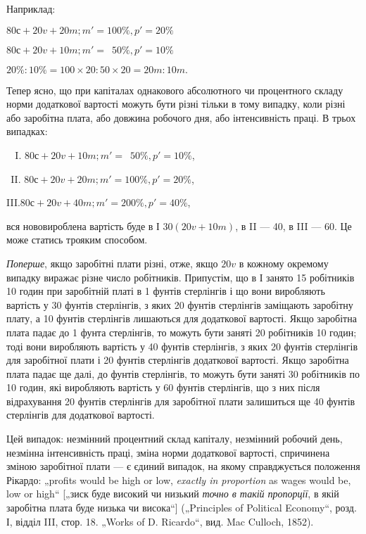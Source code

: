 
Наприклад:
\begin{center}
$80 с + 20 v + 20 m; m' = 100\%, p' = 20\%$

$80 с + 20 v + 10 m; m' = \phantom{0}50\%, p' = 10\%$

$20\%:10\% = 100×20:50×20 = 20 m:10 m.$
\end{center}

Тепер ясно, що при капіталах однакового абсолютного чи
процентного складу норми додаткової вартості можуть бути
різні тільки в тому випадку, коли різні або заробітна плата,
або довжина робочого дня, або інтенсивність праці. В трьох
випадках:
\begin{center}
$\phantom{II}$I. $80 с + 20 v + 10 m; m' = \phantom{0}50\%, p' = 10\%$,

$\phantom{I}$II. $80 с + 20 v + 20 m; m' = 100\%, p' = 20\%$,

III.$80 с + 20 v + 40 m; m' = 200\%, p' = 40\%$,
\end{center}
вся нововироблена вартість буде в І $30 (20 v + 10 m)$, в II — 40,
в III — 60. Це може статись трояким способом.

\emph{Поперше}, якщо заробітні плати різні, отже, якщо $20 v$ в кожному
окремому випадку виражає різне число робітників. Припустім,
що в І занято 15 робітників 10 годин при заробітній
платі в 1    фунтів стерлінгів і що вони виробляють вартість
у 30 фунтів стерлінгів, з яких 20 фунтів стерлінгів заміщають
заробітну плату, а 10 фунтів стерлінгів лишаються для додаткової
вартості. Якщо заробітна плата падає до 1 фунта стерлінгів,
то можуть бути заняті 20 робітників 10 годин; тоді вони
виробляють вартість у 40 фунтів стерлінгів, з яких 20 фунтів
стерлінгів для заробітної плати і 20 фунтів стерлінгів додаткової
вартості. Якщо заробітна плата падає ще далі, до  фунтів
стерлінгів, то можуть бути заняті 30 робітників по 10 годин,
які виробляють вартість у 60 фунтів стерлінгів, що з них після
відрахування 20 фунтів стерлінгів для заробітної плати залишиться
ще 40 фунтів стерлінгів для додаткової вартості.

Цей випадок: незмінний процентний склад капіталу, незмінний
робочий день, незмінна інтенсивність праці, зміна норми
додаткової вартості, спричинена зміною заробітної плати — є
єдиний випадок, на якому справджується положення Рікардо:
„profits would be high or low, \emph{exactly in proportion} as wages
would be, low or high“ [„зиск буде високий чи низький \emph{точно
в такій пропорції}, в якій заробітна плата буде низька чи висока“]
(„Principles of Political Economy“, розд. І, відділ III, стор. 18.
„Works of D. Ricardo“, вид. Mac Culloch, 1852).

